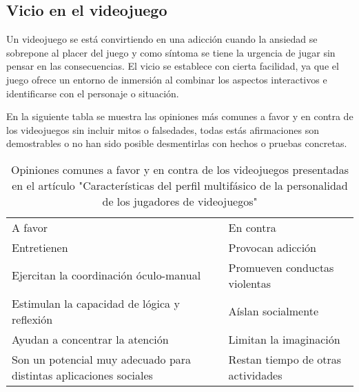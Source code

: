 \subsection{Vicio en el videojuego}\label{vicioVJ}
Un videojuego se está convirtiendo en una adicción cuando la ansiedad se sobrepone al placer del juego y como síntoma se tiene la urgencia de jugar sin pensar en las consecuencias. El vicio se establece con cierta facilidad, ya que el juego ofrece un entorno de inmersión al combinar los aspectos interactivos e identificarse con el personaje o situación.

En la siguiente tabla se muestra las opiniones más comunes a favor y en contra de los videojuegos sin incluir mitos o falsedades, todas estás afirmaciones son demostrables o no han sido posible desmentirlas con hechos o pruebas concretas.
\begin{table}[htbp]
	\centering
	\caption{Opiniones comunes a favor y en contra de los videojuegos presentadas en el artículo "Características del perfil multifásico de la personalidad de los jugadores de videojuegos" \cite{quinteroscaracteristicas}}
	\label{tab:tablaOpinión}
	\begin{tabular}{ll}
		A favor                                                            & En contra                          \\
		Entretienen                                                        & Provocan adicción                  \\
		Ejercitan la coordinación óculo-manual                             & Promueven conductas violentas      \\
		Estimulan la capacidad de lógica y reflexión                       & Aíslan socialmente                 \\
		Ayudan a concentrar la atención                                    & Limitan la imaginación             \\
		Son un potencial muy adecuado para distintas aplicaciones sociales & Restan tiempo de otras actividades
	\end{tabular}
\end{table}
\\[1pt]
	
